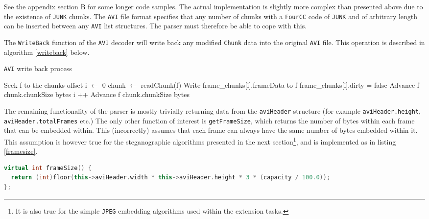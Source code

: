\documentclass[paper=a4, fontsize=11pt,twoside]{scrartcl}    %
\numberwithin{table}{section}
\numberwithin{figure}{section}
\numberwithin{algorithm}{section}
\begin{document}
\noindent
See the appendix section B for some longer code samples. The actual implementation is slightly more complex than presented above due to the existence of \texttt{JUNK} chunks. The \texttt{AVI} file format specifies that any number of chunks with a \texttt{FourCC} code of \texttt{JUNK} and of arbitrary length can be inserted between any \texttt{AVI} list structures. The parser must therefore be able to cope with this.

The \texttt{WriteBack} function of the \texttt{AVI} decoder will write back any modified \texttt{Chunk} data into the original \texttt{AVI} file. This operation is described in algorithm \ref{writeback} below.

\begin{algorithm}
\caption{\texttt{AVI} write back process}
\label{writeback}
\begin{algorithmic}[1]
\State Seek f to the chunks offset
\State i $\gets$ 0
	\State chunk $\gets$ readChunk(f)
			\State Write frame\_chunks[i].frameData to f
			\State frame\_chunks[i].dirty = false
		\Else
			\State Advance f chunk.chunkSize bytes
		\EndIf
		\State i ++
	\Else
		\State Advance f chunk.chunkSize bytes
	\EndIf
\EndWhile
\end{algorithmic}
\end{algorithm}

The remaining functionality of the parser is mostly trivially returning data from the \texttt{aviHeader} structure (for example \texttt{aviHeader.height}, \texttt{aviHeader.totalFrames} etc.) The only other function of interest is \texttt{getFrameSize}, which returns the number of bytes within each frame that can be embedded within. This (incorrectly) assumes that each frame can always have the same number of bytes embedded within it. This assumption is however true for the steganographic algorithms presented in the next section\footnote{It is also true for the simple \texttt{JPEG} embedding algorithms used within the extension tasks.}, and is implemented as in listing \ref{framesize}.

\begin{lstlisting}[language=C++, caption={\texttt{AVI} decoder \texttt{frameSize} function (\texttt{video/avi\_decoder.cc:298})}, frame=single, label=framesize]
virtual int frameSize() {
  return (int)floor(this->aviHeader.width * this->aviHeader.height * 3 * (capacity / 100.0));
};
\end{lstlisting}
\end{document}
